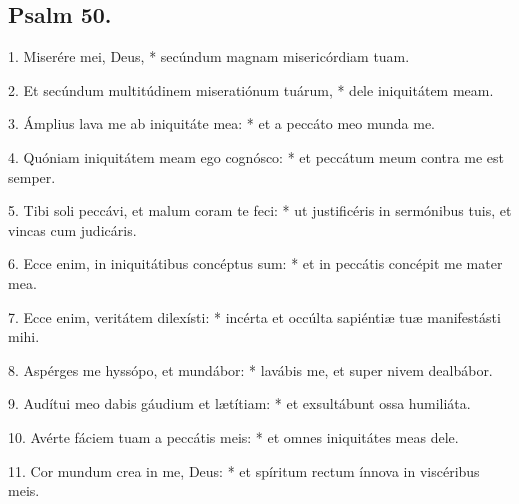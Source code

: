 









\subsection{Psalm 50.}

1. Miserére mei, Deus, * secúndum magnam misericórdiam tuam.

2. Et secúndum multitúdinem miseratiónum tuárum, * dele iniquitátem meam.

3. Ámplius lava me ab iniquitáte mea: * et a peccáto meo munda me.

4. Quóniam iniquitátem meam ego cognósco: * et peccátum meum contra me est semper.

5. Tibi soli peccávi, et malum coram te feci: * ut justificéris in sermónibus tuis, et vincas cum judicáris.

6. Ecce enim, in iniquitátibus concéptus sum: * et in peccátis concépit me mater mea.

7. Ecce enim, veritátem dilexísti: * incérta et occúlta sapiéntiæ tuæ manifestásti mihi.

8. Aspérges me hyssópo, et mundábor: * lavábis me, et super nivem dealbábor.

9. Audítui meo dabis gáudium et lætítiam: * et exsultábunt ossa humiliáta.

10. Avérte fáciem tuam a peccátis meis: * et omnes iniquitátes meas dele.

11. Cor mundum crea in me, Deus: * et spíritum rectum ínnova in viscéribus meis.

